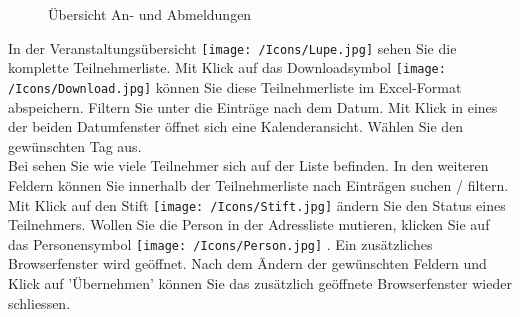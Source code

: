 \begin{figure}[H]
\caption{Übersicht An- und Abmeldungen}
\end{figure}

In der Veranstaltungsübersicht \texttt{[image: /Icons/Lupe.jpg]} sehen Sie die komplette Teilnehmerliste. Mit Klick auf das Downloadsymbol \texttt{[image: /Icons/Download.jpg]}  können Sie diese Teilnehmerliste im Excel-Format abspeichern. Filtern Sie unter  die Einträge nach dem Datum. Mit Klick in eines der beiden Datumfenster öffnet sich eine Kalenderansicht. Wählen Sie den gewünschten Tag aus. \\
Bei  sehen Sie wie viele Teilnehmer sich auf der Liste befinden. In den weiteren Feldern  können Sie innerhalb der Teilnehmerliste nach Einträgen suchen / filtern. Mit Klick auf den Stift \texttt{[image: /Icons/Stift.jpg]}  ändern Sie den Status eines Teilnehmers. Wollen Sie die Person in der Adressliste mutieren, klicken Sie auf das Personensymbol \texttt{[image: /Icons/Person.jpg]} . Ein zusätzliches Browserfenster wird geöffnet. Nach dem Ändern der gewünschten Feldern und Klick auf 'Übernehmen' können Sie das zusätzlich geöffnete Browserfenster wieder schliessen. 

\vspace{\baselineskip}

